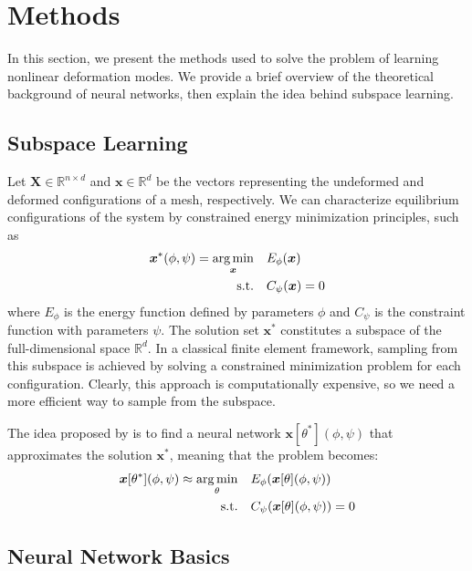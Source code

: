 \section{Methods}
\label{sec:methods}

In this section, we present the methods used to solve the problem of learning nonlinear deformation modes. We provide a brief overview of the theoretical background of neural networks, then explain the idea behind subspace learning.

\subsection{Subspace Learning}

Let \( \bm{X} \in \mathbb{R}^{n \times d} \) and \( \bm{x} \in \mathbb{R}^{d} \) be the vectors representing the undeformed and deformed configurations of a mesh, respectively. We can characterize equilibrium configurations of the system by constrained energy minimization principles, such as 
\begin{align*}
    \bm{x}^*(\phi, \psi) = \underset{\bm{x}}{\operatorname*{arg\,min}} \quad & E_\phi(\bm{x}) \\
    \text{s.t.} \quad & C_\psi(\bm{x}) = 0
\end{align*}
where \( E_\phi \) is the energy function defined by parameters \(\phi\) and \( C_\psi \) is the constraint function with parameters \(\psi\). The solution set \( \bm{x}^* \) constitutes a subspace of the full-dimensional space \( \mathbb{R}^d \). In a classical finite element framework, sampling from this subspace is achieved by solving a constrained minimization problem for each configuration. Clearly, this approach is computationally expensive, so we need a more efficient way to sample from the subspace.

The idea proposed by \cite{Wang_Du_Coros_Thomaszewski_2024} is to find a neural network \( \bm{x}[\theta^*](\phi, \psi) \) that approximates the solution \( \bm{x}^* \), meaning that the problem becomes:
\begin{align*}
    \bm{x}[\theta^*](\phi, \psi) \approx \underset{\theta}{\operatorname*{arg\,min}} \quad & E_\phi(\bm{x}[\theta](\phi, \psi)) \\
    \text{s.t.} \quad & C_\psi(\bm{x}[\theta](\phi, \psi)) = 0
\end{align*}







\subsection{Neural Network Basics}

